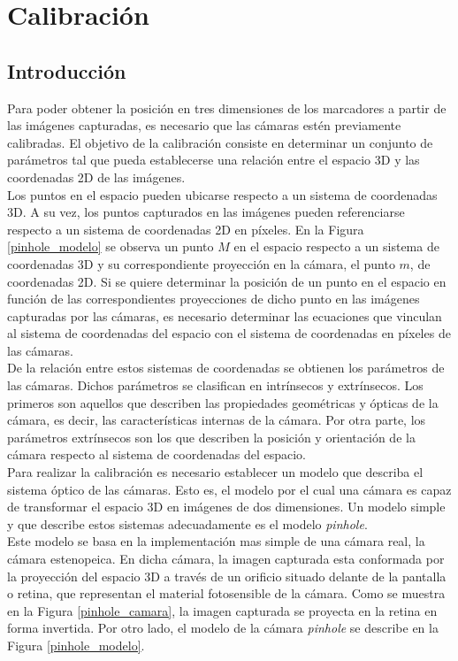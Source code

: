 \chapter{Calibración}\label{calibracion}


\section{Introducción}
Para poder obtener la posición en tres dimensiones de los marcadores a partir de las imágenes capturadas, es necesario que las cámaras estén previamente calibradas. El objetivo de la calibración consiste en determinar un conjunto de parámetros tal que pueda establecerse una relación entre el espacio 3D y las coordenadas 2D de las imágenes.\\


Los puntos en el espacio pueden ubicarse respecto a un sistema de coordenadas 3D. A su vez, los puntos capturados en las imágenes pueden referenciarse respecto a un sistema de coordenadas 2D en píxeles. En la Figura \ref{pinhole_modelo} se observa un punto $M$ en el espacio respecto a un sistema de coordenadas 3D y su correspondiente proyección en la cámara, el punto $m$, de coordenadas 2D. Si se quiere determinar la posición de un punto en el espacio en función de las correspondientes proyecciones de dicho punto en las imágenes capturadas por las cámaras, es necesario determinar las ecuaciones que vinculan al sistema de coordenadas del espacio con el sistema de coordenadas en píxeles de las cámaras.\\

De la relación entre estos sistemas de coordenadas se obtienen los parámetros de las cámaras. Dichos parámetros se clasifican en intrínsecos y extrínsecos. Los primeros son aquellos que describen las propiedades geométricas y ópticas de la cámara, es decir, las características internas de la cámara. Por otra parte, los parámetros extrínsecos son los que describen la posición y orientación de la cámara respecto al sistema de coordenadas del espacio.\\ 

Para realizar la calibración es necesario establecer un modelo que describa el sistema óptico de las cámaras. Esto es, el modelo por el cual una cámara es capaz de transformar el espacio 3D en imágenes de dos dimensiones. Un modelo simple y que describe estos sistemas adecuadamente es el modelo \textit{pinhole}.\\

Este modelo se basa en la implementación mas simple de una cámara real, la cámara estenopeica. En dicha cámara, la imagen capturada esta conformada por la proyección del espacio 3D a través de un orificio situado delante de la pantalla o retina, que representan el material fotosensible de la cámara. Como se muestra en la Figura \ref{pinhole_camara}, la imagen capturada se proyecta en la retina en forma invertida. Por otro lado, el modelo de la cámara \textit{pinhole} se describe en la Figura \ref{pinhole_modelo}.


